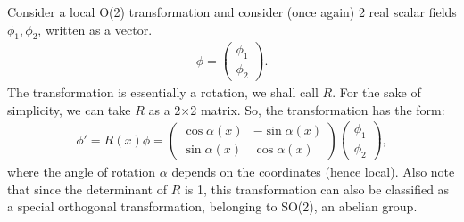 \documentclass[a4paper,11pt]{article}
\numberwithin{equation}{section}
\theoremstyle{definition}
\begin{document}
Consider a local O(2) transformation and consider (once again) 2 real scalar fields $\phi_1, \phi_2$, written as a vector.
\begin{align}
\phi = \begin{pmatrix}
\phi_1 \\ \phi_2
\end{pmatrix}.
\end{align}
The transformation is essentially a rotation, we shall call $R$. For the sake of simplicity, we can take $R$ as a 2$\times$2 matrix. So, the transformation has the form:
\begin{align}
\phi' = R(x)\phi = \begin{pmatrix}
\cos\alpha(x)&-\sin\alpha(x)\\\sin\alpha(x)&\cos\alpha(x)
\end{pmatrix}\begin{pmatrix}
\phi_1 \\ \phi_2
\end{pmatrix},
\end{align}
where the angle of rotation $\alpha$ depends on the coordinates (hence local). Also note that since the determinant of $R$ is 1, this transformation can also be classified as a special orthogonal transformation, belonging to SO(2), an abelian group.\\
\end{document}
